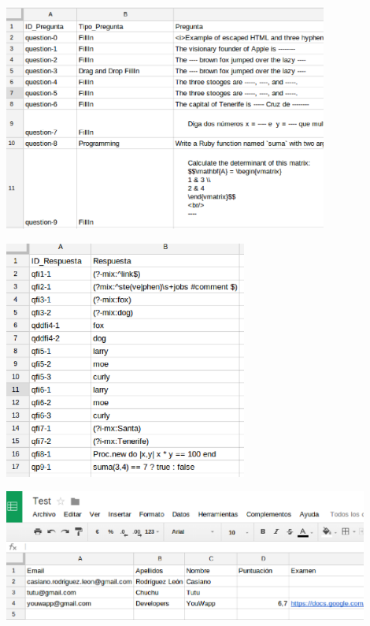 \documentclass{beamer}
\begin{document}
\begin{frame}[allowframebreaks]
\begin{itemize}
    \framebreak
    
    \begin{center}
      \includegraphics[width=0.8\textwidth]{img/app3.eps}
    \end{center}
    \framebreak
    
    \begin{center}
      \includegraphics[width=0.6\textwidth]{img/app4.eps}
    \end{center}
    \framebreak
    
    \begin{center}
      \includegraphics[width=0.9\textwidth]{img/app1.eps}
    \end{center}
    \framebreak
    

\end{itemize}
\end{frame}
\end{document}
